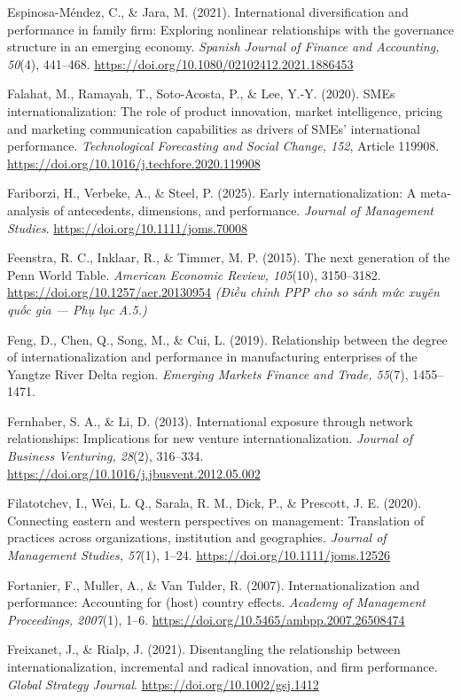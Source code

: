 \documentclass[
  a4paper,
  13pt]{extreport}
\begin{document}
Espinosa-Méndez, C., \& Jara, M. (2021). International diversification
and performance in family firm: Exploring nonlinear relationships with
the governance structure in an emerging economy. \emph{Spanish Journal
of Finance and Accounting, 50}(4), 441--468.
\url{https://doi.org/10.1080/02102412.2021.1886453}

Falahat, M., Ramayah, T., Soto-Acosta, P., \& Lee, Y.-Y. (2020). SMEs
internationalization: The role of product innovation, market
intelligence, pricing and marketing communication capabilities as
drivers of SMEs' international performance. \emph{Technological
Forecasting and Social Change, 152}, Article 119908.
\url{https://doi.org/10.1016/j.techfore.2020.119908}

Fariborzi, H., Verbeke, A., \& Steel, P. (2025). Early
internationalization: A meta-analysis of antecedents, dimensions, and
performance. \emph{Journal of Management Studies}.
\url{https://doi.org/10.1111/joms.70008}

Feenstra, R. C., Inklaar, R., \& Timmer, M. P. (2015). The next
generation of the Penn World Table. \emph{American Economic Review,
105}(10), 3150--3182. \url{https://doi.org/10.1257/aer.20130954}
\emph{(Điều chỉnh PPP cho so sánh mức xuyên quốc gia --- Phụ lục A.5.)}

Feng, D., Chen, Q., Song, M., \& Cui, L. (2019). Relationship between
the degree of internationalization and performance in manufacturing
enterprises of the Yangtze River Delta region. \emph{Emerging Markets
Finance and Trade, 55}(7), 1455--1471.

Fernhaber, S. A., \& Li, D. (2013). International exposure through
network relationships: Implications for new venture
internationalization. \emph{Journal of Business Venturing, 28}(2),
316--334. \url{https://doi.org/10.1016/j.jbusvent.2012.05.002}

Filatotchev, I., Wei, L. Q., Sarala, R. M., Dick, P., \& Prescott, J. E.
(2020). Connecting eastern and western perspectives on management:
Translation of practices across organizations, institution and
geographies. \emph{Journal of Management Studies, 57}(1), 1--24.
\url{https://doi.org/10.1111/joms.12526}

Fortanier, F., Muller, A., \& Van Tulder, R. (2007).
Internationalization and performance: Accounting for (host) country
effects. \emph{Academy of Management Proceedings, 2007}(1), 1--6.
\url{https://doi.org/10.5465/ambpp.2007.26508474}

Freixanet, J., \& Rialp, J. (2021). Disentangling the relationship
between internationalization, incremental and radical innovation, and
firm performance. \emph{Global Strategy Journal}.
\url{https://doi.org/10.1002/gsj.1412}
\end{document}
